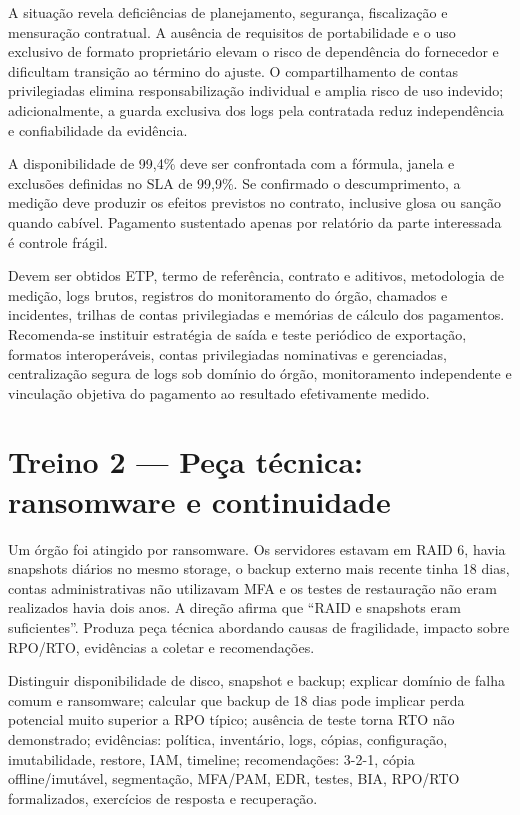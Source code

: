 \begin{teoria}
A situação revela deficiências de planejamento, segurança, fiscalização e mensuração contratual. A ausência de requisitos de portabilidade e o uso exclusivo de formato proprietário elevam o risco de dependência do fornecedor e dificultam transição ao término do ajuste. O compartilhamento de contas privilegiadas elimina responsabilização individual e amplia risco de uso indevido; adicionalmente, a guarda exclusiva dos logs pela contratada reduz independência e confiabilidade da evidência.

A disponibilidade de 99,4\% deve ser confrontada com a fórmula, janela e exclusões definidas no SLA de 99,9\%. Se confirmado o descumprimento, a medição deve produzir os efeitos previstos no contrato, inclusive glosa ou sanção quando cabível. Pagamento sustentado apenas por relatório da parte interessada é controle frágil.

Devem ser obtidos ETP, termo de referência, contrato e aditivos, metodologia de medição, logs brutos, registros do monitoramento do órgão, chamados e incidentes, trilhas de contas privilegiadas e memórias de cálculo dos pagamentos. Recomenda-se instituir estratégia de saída e teste periódico de exportação, formatos interoperáveis, contas privilegiadas nominativas e gerenciadas, centralização segura de logs sob domínio do órgão, monitoramento independente e vinculação objetiva do pagamento ao resultado efetivamente medido.
\end{teoria}

\section{Treino 2 — Peça técnica: ransomware e continuidade}

\begin{discursiva}
Um órgão foi atingido por ransomware. Os servidores estavam em RAID 6, havia snapshots diários no mesmo storage, o backup externo mais recente tinha 18 dias, contas administrativas não utilizavam MFA e os testes de restauração não eram realizados havia dois anos. A direção afirma que ``RAID e snapshots eram suficientes''. Produza peça técnica abordando causas de fragilidade, impacto sobre RPO/RTO, evidências a coletar e recomendações.
\end{discursiva}

\begin{resumo}
Distinguir disponibilidade de disco, snapshot e backup; explicar domínio de falha comum e ransomware; calcular que backup de 18 dias pode implicar perda potencial muito superior a RPO típico; ausência de teste torna RTO não demonstrado; evidências: política, inventário, logs, cópias, configuração, imutabilidade, restore, IAM, timeline; recomendações: 3-2-1, cópia offline/imutável, segmentação, MFA/PAM, EDR, testes, BIA, RPO/RTO formalizados, exercícios de resposta e recuperação.
\end{resumo}

